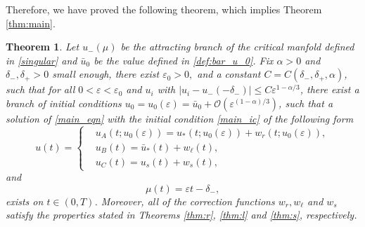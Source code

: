 \documentclass[letterpaper,11pt]{article}
\newcommand{\rmO}{\mathcal{O}}
\newcommand{\eps}{\varepsilon}
\numberwithin{equation}{section}
\theoremstyle{plain}
\newtheorem{Theorem}{Theorem}
\begin{document}
Therefore, we have proved the following theorem, which implies Theorem \ref{thm:main}.
\begin{Theorem}\label{thm:glue}
Let $u_-(\mu)$ be the attracting branch of the critical manfold defined in \eqref{singular} and $\bar{u}_0$ be the value defined in \eqref{def:bar_u_0}.
Fix $\alpha>0$ and $\delta_-,\delta_+>0$ small enough, there exist $\eps_0>0,$ and a constant $C=C(\delta_-,\delta_+,\alpha)$, such that for all $0<\eps<\eps_0$ and $u_i$ with $|u_i - u_-(-\delta_-)| \le C\eps^{1-\alpha/3}$, there exist a branch of initial conditions $u_0= u_0(\eps) = \bar{u}_0 + \rmO(\eps^{(1-\alpha)/3})$, such that a solution of 
\eqref{main_eqn} with the initial condition
\eqref{main_ic} of the following form
\begin{equation}
u(t)=\begin{cases}
&u_A(t; u_0(\eps))= u_*(t;u_0(\eps)) + w_r(t;u_0(\eps)), \\
&u_B(t)=\bar{u}_*(t) + w_\ell(t), \\
&u_C(t)=u_s(t) + w_s(t),
\end{cases}
\end{equation}
and 
\begin{equation}
\mu(t) = \eps t -\delta_-,
\end{equation}
exists on $t \in (0,T)$. Moreover, all of the correction functions $w_r, w_\ell$ and $w_s$ satisfy the properties stated in Theorems \ref{thm:r}, \ref{thm:l} and \ref{thm:s}, respectively.
\end{Theorem}
\end{document}
